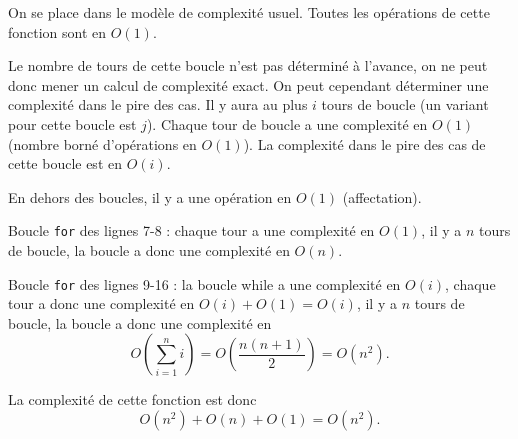 On se place dans le modèle de complexité usuel. 
Toutes les opérations de cette fonction sont en $O(1)$. 

\question{} Le nombre de tours de cette boucle n'est pas déterminé à l'avance, on ne peut donc mener un calcul de complexité exact. 
On peut cependant déterminer une complexité dans le pire des cas. 
Il y aura au plus $i$ tours de boucle (un variant pour cette boucle est $j$). 
Chaque tour de boucle a une complexité en $O(1)$ (nombre borné d'opérations en $O(1)$). 
La complexité dans le pire des cas de cette boucle est en $O(i)$. 

\question{} En dehors des boucles, il y a une opération en $O(1)$ (affectation). 

Boucle \texttt{for} des lignes 7-8 : chaque tour a une complexité en $O(1)$, il y a $n$ tours de boucle, la boucle a donc une complexité en $O(n)$. 

Boucle \texttt{for} des lignes 9-16 : la boucle while a une complexité en $O(i)$, chaque tour a donc une complexité en $O(i)+O(1)=O(i)$, il y a $n$ tours de boucle, la boucle a donc une complexité en 
\begin{equation*}
    O\left(\sum_{i=1}^n i\right) = O\left(\dfrac{n(n+1)}{2}\right) = O(n^2).
\end{equation*}

La complexité de cette fonction est donc 
\begin{equation*}
    O(n^2)+O(n)+O(1) = O(n^2).
\end{equation*}
